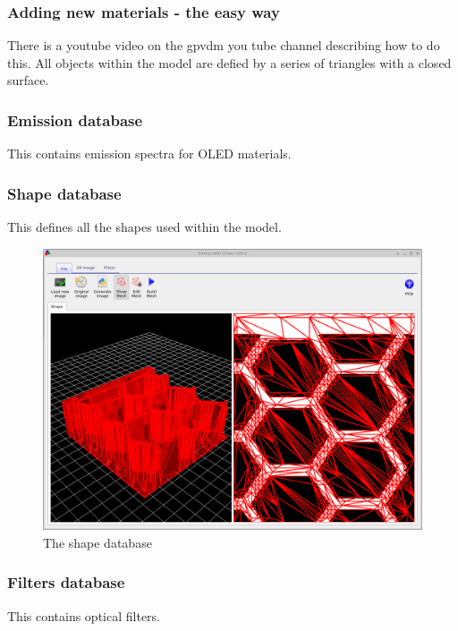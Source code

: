 \subsubsection{Adding new materials - the easy way}
There is a youtube video on the gpvdm you tube channel describing how to do this. All objects within the model are defied by a series of triangles with a closed surface.

\subsubsection{Emission database}
This contains emission spectra for OLED materials.

\subsubsection{Shape database}
This defines all the shapes used within the model.

\begin{figure}[H]
\centering
\includegraphics[width=\textwidth,height=0.7\textwidth]{./images/shape_db.png}
\caption{The shape database}
\label{fig:shapedb}
\end{figure}

\subsubsection{Filters database}
This contains optical filters.

